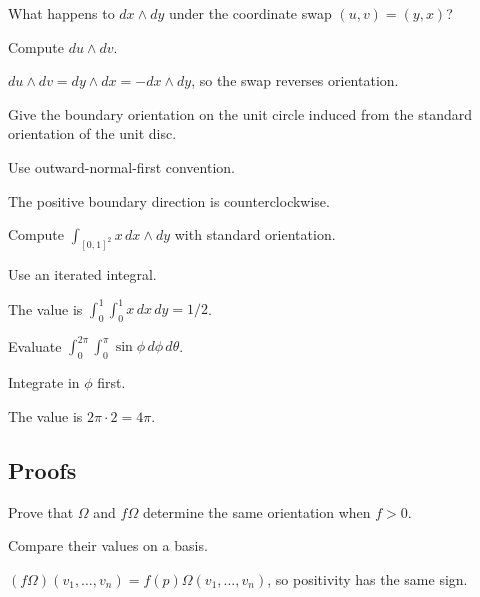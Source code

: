 \begin{exercise}\label{exr:vii10-ped-02}
What happens to \(dx\wedge dy\) under the coordinate swap \((u,v)=(y,x)\)?
\end{exercise}
\begin{hint}
Compute \(du\wedge dv\).
\end{hint}
\begin{solution}
\(du\wedge dv=dy\wedge dx=-dx\wedge dy\), so the swap reverses orientation.
\end{solution}

\begin{exercise}\label{exr:vii10-ped-03}
Give the boundary orientation on the unit circle induced from the standard orientation of the unit disc.
\end{exercise}
\begin{hint}
Use outward-normal-first convention.
\end{hint}
\begin{solution}
The positive boundary direction is counterclockwise.
\end{solution}

\begin{exercise}\label{exr:vii10-ped-04}
Compute \(\int_{[0,1]^2} x\,dx\wedge dy\) with standard orientation.
\end{exercise}
\begin{hint}
Use an iterated integral.
\end{hint}
\begin{solution}
The value is \(\int_0^1\int_0^1x\,dx\,dy=1/2\).
\end{solution}

\begin{exercise}\label{exr:vii10-ped-05}
Evaluate \(\int_0^{2\pi}\int_0^\pi \sin\phi\,d\phi\,d\theta\).
\end{exercise}
\begin{hint}
Integrate in \(\phi\) first.
\end{hint}
\begin{solution}
The value is \(2\pi\cdot2=4\pi\).
\end{solution}

\subsection*{Proofs}

\begin{exercise}\label{exr:vii10-ped-06}
Prove that \(\Omega\) and \(f\Omega\) determine the same orientation when \(f>0\).
\end{exercise}
\begin{hint}
Compare their values on a basis.
\end{hint}
\begin{solution}
\((f\Omega)(v_1,\ldots,v_n)=f(p)\Omega(v_1,\ldots,v_n)\), so positivity has the same sign.
\end{solution}

